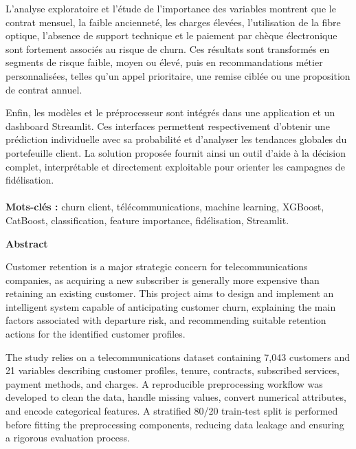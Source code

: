 \documentclass[12pt, a4paper]{article}
\begin{document}
L'analyse exploratoire et l'étude de l'importance des variables montrent que le
contrat mensuel, la faible ancienneté, les charges élevées, l'utilisation de la
fibre optique, l'absence de support technique et le paiement par chèque
électronique sont fortement associés au risque de churn. Ces résultats sont
transformés en segments de risque faible, moyen ou élevé, puis en
recommandations métier personnalisées, telles qu'un appel prioritaire, une
remise ciblée ou une proposition de contrat annuel.

Enfin, les modèles et le préprocesseur sont intégrés dans une application et un
dashboard Streamlit. Ces interfaces permettent respectivement d'obtenir une
prédiction individuelle avec sa probabilité et d'analyser les tendances
globales du portefeuille client. La solution proposée fournit ainsi un outil
d'aide à la décision complet, interprétable et directement exploitable pour
orienter les campagnes de fidélisation.\\\\


\noindent\textbf{Mots-clés :} churn client, télécommunications, machine
learning, XGBoost, CatBoost, classification, feature importance, fidélisation,
Streamlit.

\newpage
\thispagestyle{plain}
\begin{center}
    {\LARGE\bfseries\color{mlblue}Abstract\par}
\end{center}
\vspace{0.8cm}

Customer retention is a major strategic concern for telecommunications
companies, as acquiring a new subscriber is generally more expensive than
retaining an existing customer. This project aims to design and implement an
intelligent system capable of anticipating customer churn, explaining the main
factors associated with departure risk, and recommending suitable retention
actions for the identified customer profiles.

The study relies on a telecommunications dataset containing 7,043 customers and
21 variables describing customer profiles, tenure, contracts, subscribed
services, payment methods, and charges. A reproducible preprocessing workflow
was developed to clean the data, handle missing values, convert numerical
attributes, and encode categorical features. A stratified 80/20 train-test
split is performed before fitting the preprocessing components, reducing data
leakage and ensuring a rigorous evaluation process.
\end{document}
